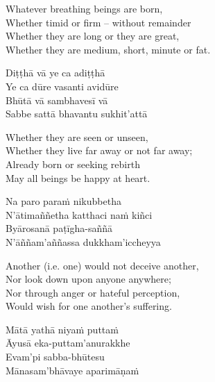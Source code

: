 \begin{english-verses}
  Whatever breathing beings are born,\\
  Whether timid or firm – without remainder\\
  Whether they are long or they are great,\\
  Whether they are medium, short, minute or fat.
\end{english-verses}

\begin{pali-hang-continued}
  Diṭṭhā vā ye ca adiṭṭhā\\
  Ye ca dūre vasanti avidūre\\
  Bhūtā vā sambhavesī vā\\
  Sabbe sattā bhavantu sukhit'attā
\end{pali-hang-continued}

\ifninebythirteen\clearpage\fi

\begin{english-verses}
  Whether they are seen or unseen,\\
  Whether they live far away or not far away;\\
  Already born or seeking rebirth\\
  May all beings be happy at heart.
\end{english-verses}

\begin{pali-hang-continued}
  Na paro paraṁ nikubbetha\\
  N'ātimaññetha katthaci naṁ kiñci\\
  Byārosanā paṭīgha-saññā\\
  N'āññam'aññassa dukkham'iccheyya
\end{pali-hang-continued}

\ifbfive\clearpage\fi
\ifafive\clearpage\fi

\begin{english-verses}
  Another (i.e. one) would not deceive another,\\
  Nor look down upon anyone anywhere;\\
  Nor through anger or hateful perception,\\
  Would wish for one another's suffering.
\end{english-verses}

\begin{pali-hang-continued}
  Mātā yathā niyaṁ puttaṁ\\
  Āyusā eka-puttam'anurakkhe\\
  Evam'pi sabba-bhūtesu\\
  Mānasam'bhāvaye aparimāṇaṁ
\end{pali-hang-continued}

